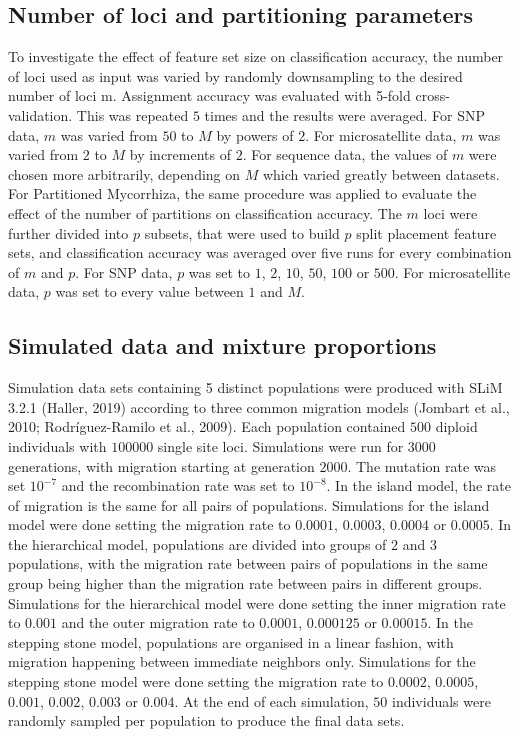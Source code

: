 \documentclass[final]{bioinfo}
\begin{document}
\begin{methods}
\subsection{Number of loci and partitioning parameters}
To investigate the effect of feature set size on classification accuracy, the number of loci used as input was varied by randomly downsampling to the desired number of loci m. Assignment accuracy was evaluated with 5-fold cross-validation. This was repeated $5$ times and the results were averaged. For SNP data, $m$ was varied from $50$ to $M$ by powers of $2$. For microsatellite data, $m$ was varied from $2$ to $M$ by increments of $2$. For sequence data, the values of $m$ were chosen more arbitrarily, depending on $M$ which varied greatly between datasets.\\
For Partitioned Mycorrhiza, the same procedure was applied to evaluate the effect of the number of partitions on classification accuracy. The $m$ loci were further divided into $p$ subsets, that were used to build $p$ split placement feature sets, and classification accuracy was averaged over five runs for every combination of $m$ and $p$. For SNP data, $p$ was set to $1$, $2$, $10$, $50$, $100$ or $500$.  For microsatellite data, $p$ was set to every value between $1$ and $M$.
\subsection{Simulated data and mixture proportions}

Simulation data sets containing 5 distinct populations were produced with SLiM 3.2.1 (Haller, 2019) according to three common migration models (Jombart et al., 2010; Rodríguez-Ramilo et al., 2009). Each population contained $500$ diploid individuals with $100000$ single site loci. Simulations were run for $3000$ generations, with migration starting at generation $2000$. The mutation rate was set $10^{-7}$ and the recombination rate was set to $10^{-8}$. In the island model, the rate of migration is the same for all pairs of populations. Simulations for the island model were done setting the migration rate to $0.0001$, $0.0003$, $0.0004$ or $0.0005$. In the hierarchical model, populations are divided into groups of $2$ and $3$ populations, with the migration rate between pairs of populations in the same group being higher than the migration rate between pairs in different groups. Simulations for the hierarchical model were done setting the inner migration rate to $0.001$ and the outer migration rate to $0.0001$, $0.000125$ or $0.00015$. In the stepping stone model, populations are organised in a linear fashion, with migration happening between immediate neighbors only. Simulations for the stepping stone model were done setting the migration rate to $0.0002$, $0.0005$, $0.001$, $0.002$, $0.003$ or $0.004$. At the end of each simulation, $50$ individuals were randomly sampled per population to produce the final data sets.


\end{methods}
\end{document}

